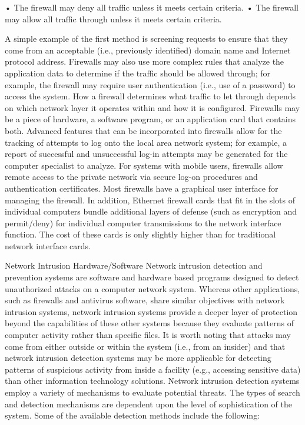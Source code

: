 \documentclass{article}
\begin{document}
• The firewall may deny all traffic unless it meets certain criteria. •
The firewall may allow all traffic through unless it meets certain
criteria.

A simple example of the first method is screening requests to ensure
that they come from an acceptable (i.e., previously identified) domain
name and Internet protocol address. Firewalls may also use more complex
rules that analyze the application data to determine if the traffic
should be allowed through; for example, the firewall may require user
authentication (i.e., use of a password) to access the system. How a
firewall determines what traffic to let through depends on which network
layer it operates within and how it is configured. Firewalls may be a
piece of hardware, a software program, or an application card that
contains both. Advanced features that can be incorporated into firewalls
allow for the tracking of attempts to log onto the local area network
system; for example, a report of successful and unsuccessful log-in
attempts may be generated for the computer specialist to analyze. For
systems with mobile users, firewalls allow remote access to the private
network via secure log-on procedures and authentication certificates.
Most firewalls have a graphical user interface for managing the
firewall. In addition, Ethernet firewall cards that fit in the slots of
individual computers bundle additional layers of defense (such as
encryption and permit/deny) for individual computer transmissions to the
network interface function. The cost of these cards is only slightly
higher than for traditional network interface cards.

Network Intrusion Hardware/Software Network intrusion detection and
prevention systems are software and hardware based programs designed to
detect unauthorized attacks on a computer network system. Whereas other
applications, such as firewalls and antivirus software, share similar
objectives with network intrusion systems, network intrusion systems
provide a deeper layer of protection beyond the capabilities of these
other systems because they evaluate patterns of computer activity rather
than specific files. It is worth noting that attacks may come from
either outside or within the system (i.e., from an insider) and that
network intrusion detection systems may be more applicable for detecting
patterns of suspicious activity from inside a facility (e.g., accessing
sensitive data) than other information technology solutions. Network
intrusion detection systems employ a variety of mechanisms to evaluate
potential threats. The types of search and detection mechanisms are
dependent upon the level of sophistication of the system. Some of the
available detection methods include the following:
\end{document}
